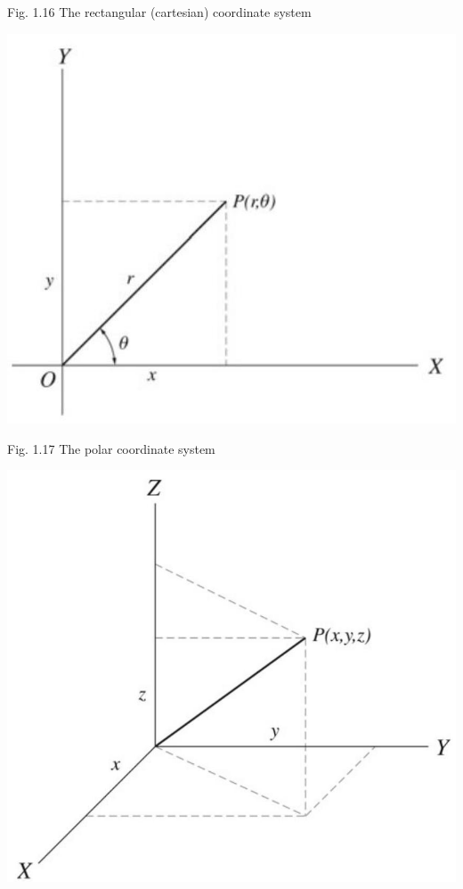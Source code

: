 \documentclass[10pt]{article}
\begin{document}
Fig. 1.16 The rectangular (cartesian) coordinate system

\begin{center}
\includegraphics[max width=\textwidth]{2024_09_13_db1f357d2aad0a03eb2eg-017(1)}
\end{center}

Fig. 1.17 The polar coordinate system

\begin{center}
\includegraphics[max width=\textwidth]{2024_09_13_db1f357d2aad0a03eb2eg-017(4)}
\end{center}
\end{document}
